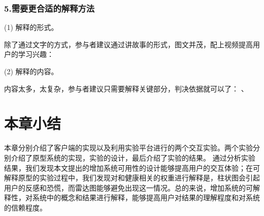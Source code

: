 \subsubsection{5.需要更合适的解释方法}
(1) 解释的形式。

除了通过文字的方式，参与者建议通过讲故事的形式，图文并茂，配上视频提高用户的学习兴趣：

(2) 解释的内容。

内容太多，太复杂，参与者建议只需要解释关键部分，判决依据就可以了：
、



\section{本章小结}

本章分别介绍了客户端的实现以及利用实验平台进行的两个交互实验。两个实验分别介绍了原型系统的实现，实验的设计，最后介绍了实验的结果。
通过分析实验结果，我们发现本文提出的增加系统可用性的设计能够提高用户的交互体验；在可解释原型的实验过程中，我们发现对和健康相关的权重进行解释是，柱状图会引起用户的反感和恐慌，而雷达图能够避免出现这一情况。总的来说，增加系统的可解释性，对系统中的概念和结果进行解释，能够提高用户对结果的理解程度和对系统的信赖程度。


